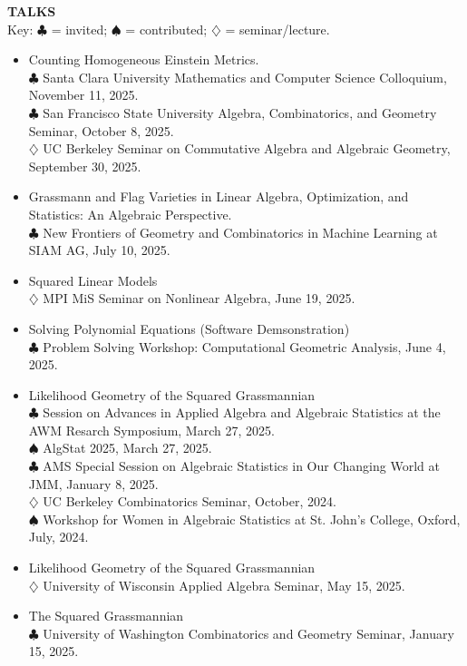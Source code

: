 \documentclass[11pt]{article}
\newcommand{\hdr}[1]{\textcolor{blue(ryb)}{\textbf{#1}}}
\begin{document}
\hdr{TALKS}\\
Key: $\clubsuit$ = invited; $\spadesuit$ = contributed; $\diamondsuit$ = seminar/lecture.
\begin{itemize}
\item Counting Homogeneous Einstein Metrics.\\
  $\clubsuit$ Santa Clara University Mathematics and Computer Science Colloquium, November 11, 2025. \\
  $\clubsuit$ San Francisco State University Algebra, Combinatorics, and Geometry Seminar, October 8, 2025.\\
  $\diamondsuit$ UC Berkeley Seminar on Commutative Algebra and Algebraic Geometry, September 30, 2025. \\
\item Grassmann and Flag Varieties in Linear Algebra, Optimization, and Statistics: An Algebraic Perspective.\\
  $\clubsuit$ New Frontiers of Geometry and Combinatorics in Machine Learning at SIAM AG, July 10, 2025.
\item Squared Linear Models\\
  $\diamondsuit$ MPI MiS Seminar on Nonlinear Algebra, June 19, 2025.
\item Solving Polynomial Equations (Software Demsonstration)\\
  $\clubsuit$  Problem Solving Workshop: Computational Geometric Analysis, June 4, 2025.
\item Likelihood Geometry of the Squared Grassmannian\\
  $\clubsuit$ Session on Advances in Applied Algebra and Algebraic Statistics at the AWM Resarch Symposium, March 27, 2025.\\    
  $\spadesuit$ AlgStat 2025, March 27, 2025.\\  
  $\clubsuit$ AMS Special Session on Algebraic Statistics in Our Changing World at JMM, January 8, 2025.\\
  $\diamondsuit$ UC Berkeley Combinatorics Seminar, October, 2024.\\
  $\spadesuit$ Workshop for Women in Algebraic Statistics at St. John's College, Oxford, July, 2024.
\item Likelihood Geometry of the Squared Grassmannian\\
  $\diamondsuit$ University of Wisconsin Applied Algebra Seminar, May 15, 2025.
\item The Squared Grassmannian\\
  $\clubsuit$ University of Washington Combinatorics and Geometry Seminar, January 15, 2025.

\end{itemize}
\end{document}
